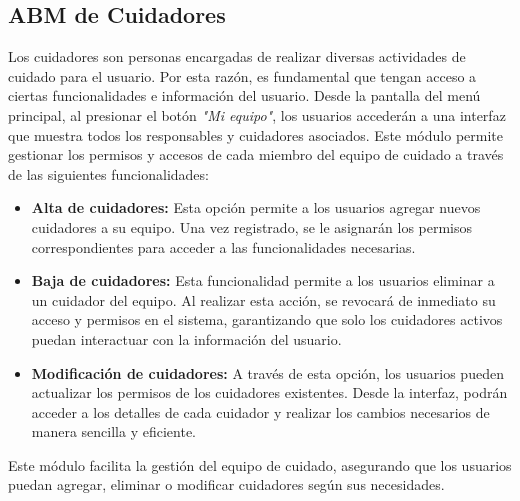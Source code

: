 \documentclass[a4paper,12pt]{article}
\begin{document}
    \subsection{ABM de Cuidadores}
    \par Los cuidadores son personas encargadas de realizar diversas actividades de cuidado para el usuario. Por esta razón, es fundamental que tengan acceso a ciertas funcionalidades e información del usuario. Desde la pantalla del menú principal, al presionar el botón \textit{"Mi equipo"}, los usuarios accederán a una interfaz que muestra todos los responsables y cuidadores asociados. Este módulo permite gestionar los permisos y accesos de cada miembro del equipo de cuidado a través de las siguientes funcionalidades:
    \begin{itemize}
        \item \textbf{Alta de cuidadores:} Esta opción permite a los usuarios agregar nuevos cuidadores a su equipo. Una vez registrado, se le asignarán los permisos correspondientes para acceder a las funcionalidades necesarias.
        \item \textbf{Baja de cuidadores:} Esta funcionalidad permite a los usuarios eliminar a un cuidador del equipo. Al realizar esta acción, se revocará de inmediato su acceso y permisos en el sistema, garantizando que solo los cuidadores activos puedan interactuar con la información del usuario.
        \item \textbf{Modificación de cuidadores:} A través de esta opción, los usuarios pueden actualizar los permisos de los cuidadores existentes. Desde la interfaz, podrán acceder a los detalles de cada cuidador y realizar los cambios necesarios de manera sencilla y eficiente.
    \end{itemize}
    \par Este módulo facilita la gestión del equipo de cuidado, asegurando que los usuarios puedan agregar, eliminar o modificar cuidadores según sus necesidades.
\end{document}
